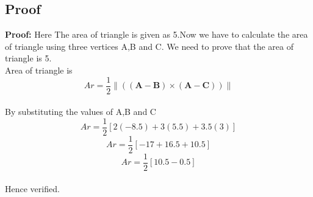 \documentclass[10pt,a4paper]{report}
\providecommand{\norm}[1]{\left\lVert#1\right\rVert}
\let\vec\mathbf
\begin{document}
\begin{multicols}{2}
\section*{Proof}
\textbf{Proof:}
Here The area of triangle is given as 5.Now we have to calculate the area of triangle using three vertices A,B and C. We need to prove that the area of triangle is 5.
\\Area of triangle is
\begin{equation}
Ar=\frac{1}{2}\norm{(\vec{(A-B)}\times\vec{(A-C)})}
\end{equation}
\\By substituting the values of A,B and C\\
\begin{equation}
 Ar=\frac{1}{2}[2(-8.5)+3(5.5)+3.5(3)]  
 \end{equation}
 \begin{equation}
 Ar=\frac{1}{2}[-17+16.5+10.5]  
 \end{equation}
 \begin{equation}
  Ar=\frac{1}{2}[10.5-0.5]  
 \end{equation}
\centering
{}
\vspace{0.25cm}
\\Hence verified.
\end{multicols}
\end{document}
